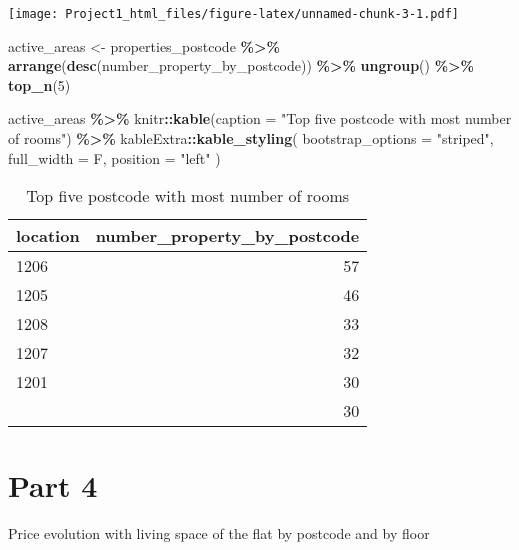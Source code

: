 \documentclass[
]{article}
\newenvironment{Shaded}{\begin{snugshade}}{\end{snugshade}}
\newcommand{\AttributeTok}[1]{\textcolor[rgb]{0.13,0.29,0.53}{#1}}
\newcommand{\DecValTok}[1]{\textcolor[rgb]{0.00,0.00,0.81}{#1}}
\newcommand{\FunctionTok}[1]{\textcolor[rgb]{0.13,0.29,0.53}{\textbf{#1}}}
\newcommand{\NormalTok}[1]{#1}
\newcommand{\OtherTok}[1]{\textcolor[rgb]{0.56,0.35,0.01}{#1}}
\newcommand{\SpecialCharTok}[1]{\textcolor[rgb]{0.81,0.36,0.00}{\textbf{#1}}}
\newcommand{\StringTok}[1]{\textcolor[rgb]{0.31,0.60,0.02}{#1}}
\begin{document}
\texttt{[image: Project1\_html\_files/figure-latex/unnamed-chunk-3-1.pdf]}

\begin{Shaded}
\begin{Highlighting}[]
\NormalTok{active\_areas }\OtherTok{\textless{}{-}}\NormalTok{ properties\_postcode }\SpecialCharTok{\%\textgreater{}\%}
  \FunctionTok{arrange}\NormalTok{(}\FunctionTok{desc}\NormalTok{(number\_property\_by\_postcode)) }\SpecialCharTok{\%\textgreater{}\%}
  \FunctionTok{ungroup}\NormalTok{() }\SpecialCharTok{\%\textgreater{}\%}
  \FunctionTok{top\_n}\NormalTok{(}\DecValTok{5}\NormalTok{)}

\NormalTok{active\_areas }\SpecialCharTok{\%\textgreater{}\%}
\NormalTok{  knitr}\SpecialCharTok{::}\FunctionTok{kable}\NormalTok{(}\AttributeTok{caption =} \StringTok{"Top five postcode with most number of rooms"}\NormalTok{) }\SpecialCharTok{\%\textgreater{}\%}
\NormalTok{  kableExtra}\SpecialCharTok{::}\FunctionTok{kable\_styling}\NormalTok{(}
    \AttributeTok{bootstrap\_options =} \StringTok{"striped"}\NormalTok{,}
    \AttributeTok{full\_width =}\NormalTok{ F,}
    \AttributeTok{position =} \StringTok{"left"}
\NormalTok{  )}
\end{Highlighting}
\end{Shaded}

\begin{longtable}[l]{lr}
\caption{\label{tab:unnamed-chunk-3}Top five postcode with most number of rooms}\\
\toprule
location & number\_property\_by\_postcode\\
\midrule
1206 & 57\\
1205 & 46\\
1208 & 33\\
1207 & 32\\
1201 & 30\\
\addlinespace
1202 & 30\\
\bottomrule
\end{longtable}

\hypertarget{part-4}{%
\section{Part 4}\label{part-4}}

Price evolution with living space of the flat by postcode and by floor
\end{document}
